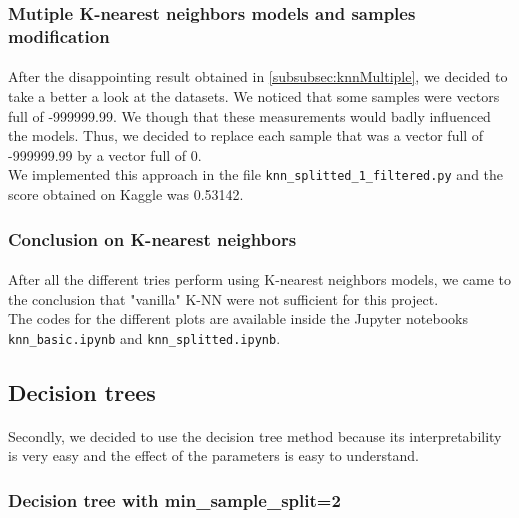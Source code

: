 \documentclass[a4paper, 11pt, oneside]{article}
\begin{document}
\subsubsection{Mutiple K-nearest neighbors models and samples modification} \label{subsubsec:knnMultipleModif}
\paragraph{}After the disappointing result obtained in \ref{subsubsec:knnMultiple}, we decided to take a better a look at the datasets. We noticed that some samples were vectors full of -999999.99. We though that these measurements would badly influenced the models. Thus, we decided to replace each sample that was a vector full of -999999.99 by a vector full of 0.\\
We implemented this approach in the file \texttt{knn\_splitted\_1\_filtered.py} and the score obtained on Kaggle was 0.53142.

\subsubsection{Conclusion on K-nearest neighbors}
\paragraph{}After all the different tries perform using K-nearest neighbors models, we came to the conclusion that "vanilla" K-NN were not sufficient for this project.\\
The codes for the different plots are available inside the Jupyter notebooks \texttt{knn\_basic.ipynb} and \texttt{knn\_splitted.ipynb}.


\subsection{Decision trees}\label{subsec:dt}
\paragraph{}Secondly, we decided to use the decision tree method because its interpretability is very easy and the effect of the parameters is easy to understand.

\subsubsection{Decision tree with min\_sample\_split=2} \label{subsubsec:dt2}
\end{document}
